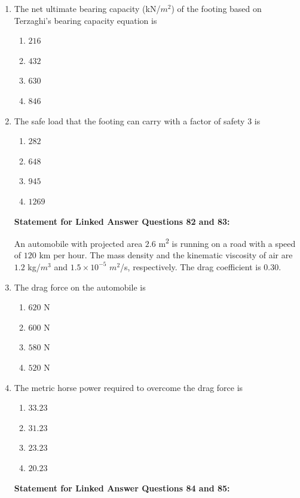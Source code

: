 \documentclass[journal]{IEEEtran}
\begin{document}
\begin{enumerate}
\item The net ultimate bearing capacity (kN/$m^{2}$) of the footing based on Terzaghi's bearing capacity equation is \hfill {}
\begin{enumerate}
\item $216$
\item $432$
\item $630$
\item $846$
\end{enumerate}

\item The safe load  that the footing can carry with a factor of safety $3$ is \hfill {}
\begin{enumerate}
\item $282$
\item $648$
\item $945$
\item $1269$
\end{enumerate}

\vspace{0.5cm}
\textbf{Statement for Linked Answer Questions 82 and 83:}

An automobile with projected area $2.6$ m\textsuperscript{2} is running on a road with a speed of $120$ km per hour. The mass density and the kinematic viscosity of air are $1.2$ kg/$m^{3}$ and $1.5 \times 10^{-5}$ $m^{2}$/s, respectively. The drag coefficient is $0.30$.

\item The drag force on the automobile is \hfill {}
\begin{enumerate}
\item $620$ N
\item $600$ N
\item $580$ N
\item $520$ N
\end{enumerate}

\item The metric horse power required to overcome the drag force is \hfill {}
\begin{enumerate}
\item $33.23$
\item $31.23$
\item $23.23$
\item $20.23$
\end{enumerate}

\vspace{0.5cm}
\textbf{Statement for Linked Answer Questions 84 and 85:}


\end{enumerate}
\end{document}
